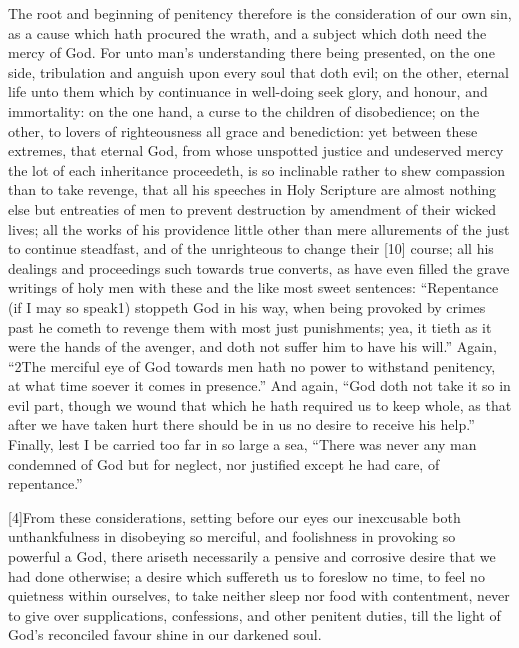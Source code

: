 The root and beginning of penitency therefore is the consideration of our own sin, as a cause which hath procured the wrath, and a subject which doth need the mercy of God. For unto man’s understanding there being presented, on the one side, tribulation and anguish upon every soul that doth evil; on the other, eternal life unto them which by continuance in well-doing seek glory, and honour, and immortality: on the one hand, a curse to the children of disobedience; on the other, to lovers of righteousness all grace and benediction: yet between these extremes, that eternal God, from whose unspotted justice and undeserved mercy the lot of each inheritance proceedeth, is so inclinable rather to shew compassion than to take revenge, that all his speeches in Holy Scripture are almost nothing else but entreaties of men to prevent destruction by amendment of their wicked lives; all the works of his providence little other than mere allurements of the just to continue steadfast, and of the unrighteous to change their [10] course; all his dealings and proceedings such towards true converts, as have even filled the grave writings of holy men with these and the like most sweet sentences: “Repentance (if I may so speak1) stoppeth God in his way, when being provoked by crimes past he cometh to revenge them with most just punishments; yea, it tieth as it were the hands of the avenger, and doth not suffer him to have his will.” Again, “2The merciful eye of God towards men hath no power to withstand penitency, at what time soever it comes in presence.” And again, “God doth not take it so in evil part, though we wound that which he hath required us to keep whole, as that after we have taken hurt there should be in us no desire to receive his help.” Finally, lest I be carried too far in so large a sea, “There was never any man condemned of God but for neglect, nor justified except he had care, of repentance.”

[4]From these considerations, setting before our eyes our inexcusable both unthankfulness in disobeying so merciful, and foolishness in provoking so powerful a God, there ariseth necessarily a pensive and corrosive desire that we had done otherwise; a desire which suffereth us to foreslow no time, to feel no quietness within ourselves, to take neither sleep nor food with contentment, never to give over supplications, confessions, and other penitent duties, till the light of God’s reconciled favour shine in our darkened soul.

